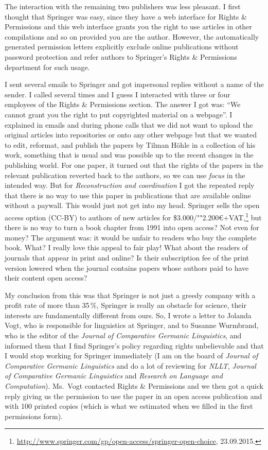 \begin{refsection}
The interaction with the remaining two publishers was less pleasant. I first thought that Springer
was easy, since they have a web interface for Rights \& Permissions and this web interface
grants you the right to use articles in other compilations and so on provided you are the
author. However, the automatically generated permission letters explicitly exclude online
publications without password protection and refer authors to Springer's Rights \& Permissions department for such usage.

I sent several emails to Springer and got impersonal replies without a name of the sender. I called
several times and I guess I interacted with three or four employees of the Rights \& Permissions
section. The answer I got was: ``We cannot grant you the right to put copyrighted material on a
webpage''. I explained in emails and during phone calls that we did not want to upload the original
articles into repositories or onto any other webpage but that we wanted to edit, reformat, and publish
the papers by Tilman Höhle in a collection of his work, something that is usual and was possible up
to the recent changes in the publishing world. For one paper, it turned out that the rights of the
papers in the relevant publication reverted back to the authors, so we can use \emph{ focus} in the intended way. But for
\emph{Reconstruction and coordination} I got the repeated reply that there is no way to use this
paper in publications that are available online without a paywall. This would just not get into my
head. Springer sells the open access option (CC-BY) to authors of new articles for \$3.000/""2.200\euro+VAT,\footnote{%
  \url{http://www.springer.com/gp/open-access/springer-open-choice}, 23.09.2015.%
}
but there is no way to turn a book chapter from 1991 into open access? Not even for money? The argument was: it
would be unfair to readers who buy the complete book. What? I really love this appeal to fair play!
What about the readers of journals that appear in print and online? Is their subscription fee of the print version lowered when the journal contains
papers whose authors paid to have their content open access?

My conclusion from this was that Springer is not just a greedy company with a profit rate of more
than 35\,\%, Springer is really an obstacle for science, their interests are fundamentally different from ours. So,
I wrote a letter to Jolanda Vogt, who is responsible for linguistics at Springer, and to Susanne
Wurmbrand, who is the editor of the \emph{Journal of Comparative Germanic Linguistics}, and informed them
that I find Springer's policy regarding rights unbelievable and that I would stop working for
Springer immediately (I am on the board of \emph{Journal of Comparative Germanic Linguistics} and do a lot of reviewing for \emph{NLLT}, \emph{Journal of
Comparative Germanic Linguistics} and \emph{Research on Language and Computation}). Ms.\ Vogt contacted Rights \&
Permissions and we then got a quick reply giving us the permission to use the paper in an open
access publication and with 100 printed copies (which is what we estimated when we filled in the
first permissions form). 


\end{refsection}

